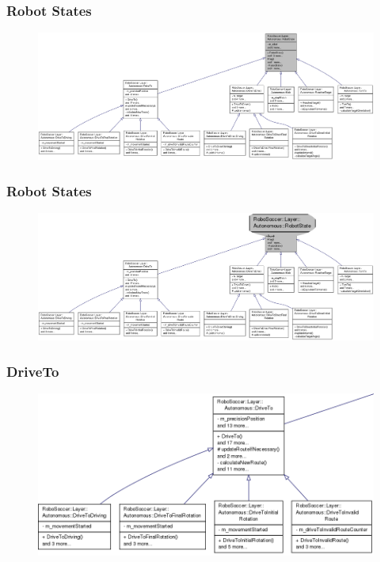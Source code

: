 \documentclass[hyperref={pdfpagelabels=false},compress]{beamer}
\begin{document}
\begin{frame}
	\frametitle{Robot States}
	\center
	\begin{figure}
		\centering
		\includegraphics[width = \textwidth]{inheritance_graph_robotstates.png}
	\end{figure}
\end{frame}

\begin{frame}
	\frametitle{Robot States}
	\center
	\begin{figure}
		\centering
		\includegraphics[width = \textwidth]{inheritance_graph_robotstates_zoomed.png}
	\end{figure}
\end{frame}

\begin{frame}
	\frametitle{DriveTo}
	\center
	\begin{figure}
		\centering
		\includegraphics[width = \textwidth]{inheritance_graph_robotstates_driveto.png}
	\end{figure}
\end{frame}
\end{document}
